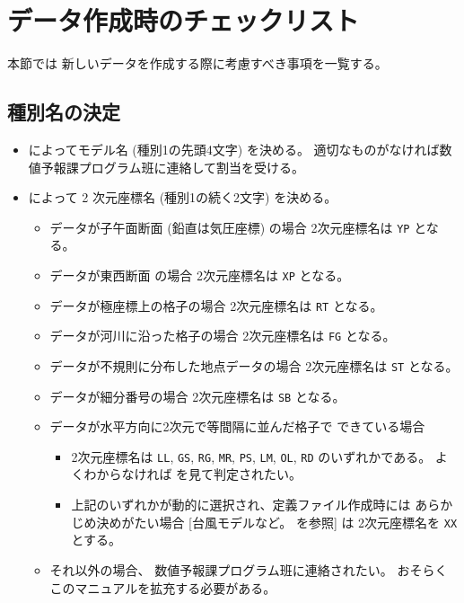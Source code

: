 
\section{データ作成時のチェックリスト}
\label{sec:writers}

本節では
新しいデータを作成する際に考慮すべき事項を一覧する。


\subsection{種別名の決定}

\begin{itemize}
\item
	 によってモデル名 (種別1の先頭4文字) を決める。
	適切なものがなければ数値予報課プログラム班に連絡して割当を受ける。
\item
    によって 2 次元座標名 (種別1の続く2文字) を決める。
    \begin{itemize}
    \item データが子午面断面 (鉛直は気圧座標) の場合
	2次元座標名は {\tt YP} となる。
    \item データが東西断面 の場合
	2次元座標名は {\tt XP} となる。
    \item データが極座標上の格子の場合
	2次元座標名は {\tt RT} となる。
    \item データが河川に沿った格子の場合
	2次元座標名は {\tt FG} となる。
    \item データが不規則に分布した地点データの場合
	2次元座標名は {\tt ST} となる。
    \item データが細分番号の場合
	2次元座標名は {\tt SB} となる。
    \item データが水平方向に2次元で等間隔に並んだ格子で
	できている場合
	\begin{itemize}
	\item 2次元座標名は
	    {\tt LL}, {\tt GS}, {\tt RG}, {\tt MR}, {\tt PS}, {\tt LM},
	    {\tt OL}, {\tt RD} のいずれかである。
	    よくわからなければ  を見て判定されたい。
	\item 上記のいずれかが動的に選択され、定義ファイル作成時には
	    あらかじめ決めがたい場合
	    [台風モデルなど。 を参照]
	    は 2次元座標名を {\tt XX} とする。
	\end{itemize}
    \item それ以外の場合、
	数値予報課プログラム班に連絡されたい。
	おそらくこのマニュアルを拡充する必要がある。

\end{itemize}
\end{itemize}
